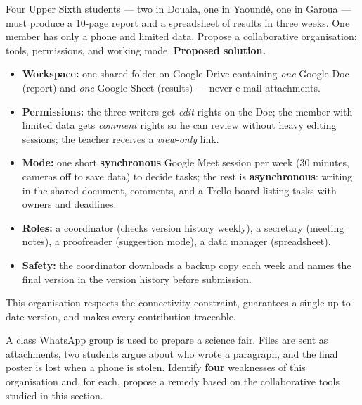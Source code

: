 \documentclass[11pt]{article}
\begin{document}
\begin{exoresolu}
Four Upper Sixth students --- two in Douala, one in Yaound\'e, one in Garoua --- must produce a 10-page report and a spreadsheet of results in three weeks. One member has only a phone and limited data. Propose a collaborative organisation: tools, permissions, and working mode.
\tcblower
\textbf{Proposed solution.}
\begin{itemize}
\item \textbf{Workspace:} one shared folder on Google Drive containing \emph{one} Google Doc (report) and \emph{one} Google Sheet (results) --- never e-mail attachments.
\item \textbf{Permissions:} the three writers get \emph{edit} rights on the Doc; the member with limited data gets \emph{comment} rights so he can review without heavy editing sessions; the teacher receives a \emph{view-only} link.
\item \textbf{Mode:} one short \textbf{synchronous} Google Meet session per week (30 minutes, cameras off to save data) to decide tasks; the rest is \textbf{asynchronous}: writing in the shared document, comments, and a Trello board listing tasks with owners and deadlines.
\item \textbf{Roles:} a coordinator (checks version history weekly), a secretary (meeting notes), a proofreader (suggestion mode), a data manager (spreadsheet).
\item \textbf{Safety:} the coordinator downloads a backup copy each week and names the final version in the version history before submission.
\end{itemize}
This organisation respects the connectivity constraint, guarantees a single up-to-date version, and makes every contribution traceable.
\end{exoresolu}

\begin{exercice}
A class WhatsApp group is used to prepare a science fair. Files are sent as attachments, two students argue about who wrote a paragraph, and the final poster is lost when a phone is stolen. Identify \textbf{four} weaknesses of this organisation and, for each, propose a remedy based on the collaborative tools studied in this section.
\end{exercice}
\end{document}
